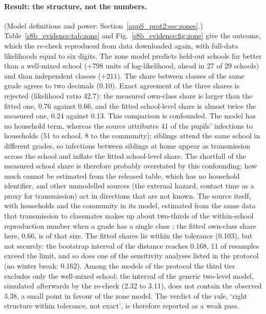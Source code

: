 \paragraph{Result: the structure, not the numbers.} (Model definitions and power: Section~\ref{appS_prot2:sec:zones}.)
Table~\ref{s8b_evidence:tab:zone} and Fig.~\ref{s8b_evidence:fig:zone} give the outcome, which the
re-check reproduced from data downloaded again, with full-data likelihoods equal to six digits. The zone model
predicts held-out schools far better than a well-mixed school ($+798$ units of log-likelihood, ahead in 27 of
29 schools) and than independent classes ($+211$). The share between classes of the same grade agrees to
two decimals (0.10). Exact agreement of the three shares is rejected (likelihood ratio 42.7): the measured
own-class share is larger than the fitted one, 0.76 against 0.66, and the fitted school-level share is almost
twice the measured one, 0.24 against 0.13. This comparison is confounded. The model has no household term,
whereas the source attributes 41\pct{} of the pupils' infections to households (51\pct{} to school, 8\pct{} to
the community); siblings attend the same school in different grades, so infections between siblings at home
appear as transmission across the school and inflate the fitted school-level share. The shortfall of the
measured school share is therefore probably overstated by this confounding; how much cannot be estimated from
the released table, which has no household identifier, and other unmodelled sources (the external hazard,
contact time as a proxy for transmission) act in directions that are not known. The source itself, with households and the community in its
model, estimated from the same data that transmission to classmates makes up about two-thirds of the
within-school reproduction number when a grade has a single class \citep{endo2021within}; the fitted own-class
share here, 0.66, is of that size. The fitted shares lie within the tolerance (0.103), but not securely: the bootstrap interval
of the distance reaches 0.168, 11\pct{} of resamples exceed the limit, and so does one of the sensitivity
analyses listed in the protocol (no winter break: 0.162). Among the models of the protocol the third tier
excludes only the well-mixed school; the interval of the generic two-level model, simulated afterwards by the
re-check (2.32 to 3.11), does not contain the observed 3.38, a small point in favour of the zone
model. The verdict of the rule, `right structure within tolerance, not exact', is therefore reported as a weak pass.

